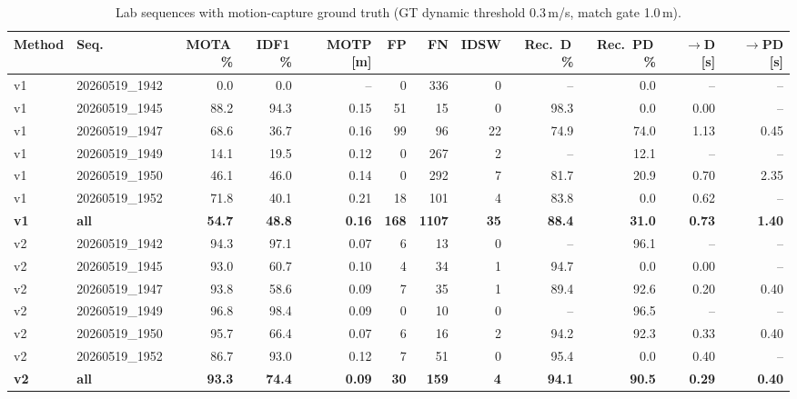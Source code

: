 \begin{table}[t]
\centering
\caption{Lab sequences with motion-capture ground truth (GT dynamic threshold 0.3\,m/s, match gate 1.0\,m).}
\label{tab:own_mocap}
\setlength{\tabcolsep}{3pt}
\begin{tabular}{llrrrrrrrrrr}
\toprule
Method & Seq. & MOTA\,\% & IDF1\,\% & MOTP [m] & FP & FN & IDSW & Rec.\ D\,\% & Rec.\ PD\,\% & $\to$D [s] & $\to$PD [s] \\
\midrule
v1 & 20260519\_1942 & 0.0 & 0.0 & -- & 0 & 336 & 0 & -- & 0.0 & -- & -- \\
v1 & 20260519\_1945 & 88.2 & 94.3 & 0.15 & 51 & 15 & 0 & 98.3 & 0.0 & 0.00 & -- \\
v1 & 20260519\_1947 & 68.6 & 36.7 & 0.16 & 99 & 96 & 22 & 74.9 & 74.0 & 1.13 & 0.45 \\
v1 & 20260519\_1949 & 14.1 & 19.5 & 0.12 & 0 & 267 & 2 & -- & 12.1 & -- & -- \\
v1 & 20260519\_1950 & 46.1 & 46.0 & 0.14 & 0 & 292 & 7 & 81.7 & 20.9 & 0.70 & 2.35 \\
v1 & 20260519\_1952 & 71.8 & 40.1 & 0.21 & 18 & 101 & 4 & 83.8 & 0.0 & 0.62 & -- \\
\textbf{v1} & \textbf{all} & \textbf{54.7} & \textbf{48.8} & \textbf{0.16} & \textbf{168} & \textbf{1107} & \textbf{35} & \textbf{88.4} & \textbf{31.0} & \textbf{0.73} & \textbf{1.40} \\
\midrule
v2 & 20260519\_1942 & 94.3 & 97.1 & 0.07 & 6 & 13 & 0 & -- & 96.1 & -- & -- \\
v2 & 20260519\_1945 & 93.0 & 60.7 & 0.10 & 4 & 34 & 1 & 94.7 & 0.0 & 0.00 & -- \\
v2 & 20260519\_1947 & 93.8 & 58.6 & 0.09 & 7 & 35 & 1 & 89.4 & 92.6 & 0.20 & 0.40 \\
v2 & 20260519\_1949 & 96.8 & 98.4 & 0.09 & 0 & 10 & 0 & -- & 96.5 & -- & -- \\
v2 & 20260519\_1950 & 95.7 & 66.4 & 0.07 & 6 & 16 & 2 & 94.2 & 92.3 & 0.33 & 0.40 \\
v2 & 20260519\_1952 & 86.7 & 93.0 & 0.12 & 7 & 51 & 0 & 95.4 & 0.0 & 0.40 & -- \\
\textbf{v2} & \textbf{all} & \textbf{93.3} & \textbf{74.4} & \textbf{0.09} & \textbf{30} & \textbf{159} & \textbf{4} & \textbf{94.1} & \textbf{90.5} & \textbf{0.29} & \textbf{0.40} \\
\bottomrule
\end{tabular}
\end{table}
